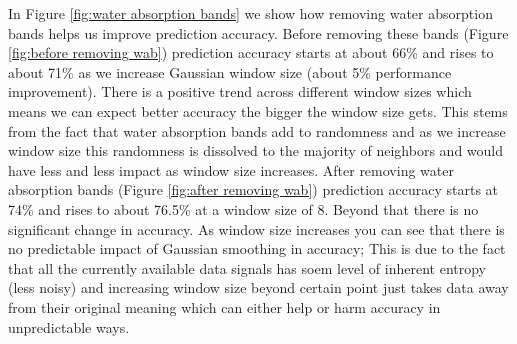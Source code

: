 \documentclass[remotesensing,article,accept,moreauthors,pdftex,12pt,a4paper]{mdpi}
\begin{document}
In Figure \ref{fig:water absorption bands} we show how removing water absorption bands helps us improve prediction accuracy. 
Before removing these bands (Figure \ref{fig:before removing wab}) prediction accuracy starts at about 66\% and rises to about 71\% as we increase Gaussian window size (about 5\% performance improvement). 
There is a positive trend across different window sizes which means we can expect better accuracy the bigger the window size gets. 
This stems from the fact that water absorption bands add to randomness and as we increase window size this randomness is dissolved to the majority of neighbors and would have less and less impact as window size increases. 
After removing water absorption bands (Figure \ref{fig:after removing wab}) prediction accuracy starts at 74\% and rises to about 76.5\% at a window size of 8. 
Beyond that there is no significant change in accuracy.
As window size increases you can see that there is no predictable impact of Gaussian smoothing in accuracy; 
This is due to the fact that all the currently available data signals has soem level of inherent entropy (less noisy) and increasing window size beyond certain point just takes data away from their original meaning which can either help or harm accuracy in unpredictable ways. 







\end{document}
